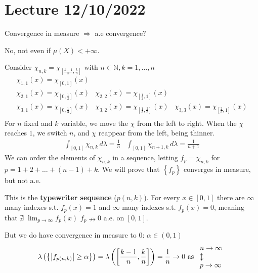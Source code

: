 \section{Lecture 12/10/2022}
\begin{remark}
    Convergence in measure \(\Rightarrow\) a.e convergence?

    No, not even if \(\mu(X) < +\infty\).

    Consider \(\chi_{n,k} = \chi_{[\frac{k-1}{n}, \frac{k}{n}]}\) with \(n \in \mathbb{N}, k = 1, \ldots, n\)
    \[
        \begin{array}{ccc}
            \chi_{1,1}(x) = \chi_{[0, 1]}(x) & & \\
            \chi_{2,1}(x) = \chi_{[0, \frac{1}{2}]}(x) & \chi_{2,2}(x) = \chi_{[\frac{1}{2}, 1]}(x) & \\
            \chi_{3,1}(x) = \chi_{[0, \frac{1}{3}]}(x) & \chi_{3,2}(x) = \chi_{[\frac{1}{3}, \frac{2}{3}]}(x) &\chi_{3,3}(x) = \chi_{[\frac{2}{3}, 1]}(x) \\
        \end{array}
    \]
    For \(n\) fixed and \(k\) variable, we move the \(\chi\) from the left to right. When the \(\chi\) reaches \(1\), we switch \(n\), and \(\chi\) reappear from the left, being thinner. 
    \[
        \begin{array}{cc}
            \int_{[0,1]} \chi_{n,k} \, d\lambda = \frac{1}{n} & \int_{[0,1]} \chi_{n+1, k} \, d\lambda = \frac{1}{n+1}
        \end{array}
    \]
    We can order the elements of \(\chi_{n,k}\) in a sequence, letting
    \(f_p = \chi_{n,k}\) for \(p=1+2+\ldots+(n-1)+k\). We will prove that \(\left\{ f_p \right\}\) converges in measure, but not a.e. 

    This is the \textbf{typewriter sequence} (\(p(n,k)\)). For every \(x \in [0,1]\) there are \(\infty\) many indexes s.t. \(f_p(x) = 1\) and \(\infty\) many indexes s.t. \(f_p(x) = 0\), meaning that \(\nexists \; \lim_{p\to \infty} f_p(x)\)
    \( f_p \nrightarrow 0 \) a.e. on \(\left[ 0, 1\right]\).

    But we do have convergence in measure to \(0\): \(\alpha \in (0,1)\)
    \[
        \lambda\left(\left\{ \abs{f_{p(n,k)}} \geq \alpha \right\}\right) = \lambda \left(\left[ \frac{k-1}{n}, \frac{k}{n} \right]\right) = \frac{1}{n} \to 0 \mbox{ as } \begin{array}{l}
            n\to \infty \\
            \updownarrow \\
            p \to \infty        
        \end{array}
    \]
\end{remark}
